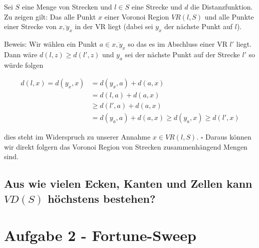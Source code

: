 \documentclass[a4paper]{article}
\begin{document}
Sei $S$ eine Menge von Strecken und $l \in S$ eine Strecke und $d$ die Distanzfunktion.
Zu zeigen gilt: Das alle Punkt $x$ einer Voronoi Region  $VR(l, S)$ und alle Punkte einer Strecke von $\overline{x, y_x}$ in der VR liegt (dabei sei $y_x$ der nächste Punkt auf $l$).

Beweis: Wir wählen ein Punkt $a \in \overline{x, y_x}$ so das es im Abschluss einer VR $l'$ liegt. Dann wäre $d(l, z) \geq d(l', z)$ und $y_a$ sei der nächste Punkt auf der Strecke $l'$ so würde folgen

\begin{align}
d(l,x)=d(y_x, x) &= d(y_x,a)+d(a, x)\\
&= d(l, a) +  d(a, x) \\
&\geq d(l', a) +  d(a, x) \\
&= d(y_a, a) +  d(a, x) \geq d(y_a, x) \geq d(l', x)
\end{align} 

dies steht im Widerspruch zu unserer Annahme $x \in VR(l,S)$. $\square$ Daraus können wir direkt folgern das Voronoi Region von Strecken zusammenhängend Mengen sind.

\cite{Klein1997}

\subsection*{Aus wie vielen Ecken, Kanten und Zellen kann $VD(S)$ höchstens bestehen?}




\section*{Aufgabe 2 - Fortune-Sweep}
\end{document}
